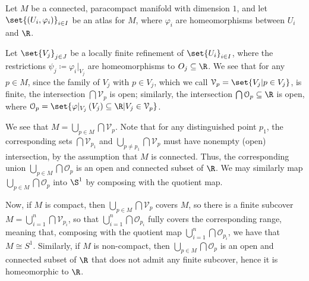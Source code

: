 \documentclass[10pt]{mypackage}
\begin{document}
\begin{solution}
  Let $M$ be a connected, paracompact manifold with dimension $1$, and let $\set{\left( U_i,\varphi_i \right)}_{i\in I}$ be an atlas for $M$, where $\varphi_i$ are homeomorphisms between $U_i$ and $\R$.\newline

  Let $\set{V_{j}}_{j\in J}$ be a locally finite refinement of $\set{U_i}_{i\in I}$, where the restrictions $\psi_j \coloneq \varphi_i|_{V_j}$ are homeomorphisms to $O_{j}\subseteq \R$. We see that for any $p\in M$, since the family of $V_j$ with $p\in V_j$, which we call $\mathcal{V}_p = \set{V_j | p\in V_j}$, is finite, the intersection $\bigcap \mathcal{V}_p$ is open; similarly, the intersection $\bigcap \mathcal{O}_p\subseteq \R$ is open, where $\mathcal{O}_p = \set{\varphi\vert_{V_j}\left( V_j \right)\subseteq \R | V_j\in \mathcal{V}_p}$.\newline

  We see that $M = \bigcup_{p\in M} \bigcap \mathcal{V}_p$. Note that for any distinguished point $p_1$, the corresponding sets $\bigcap \mathcal{V}_{p_1}$ and $\bigcup_{p\neq p_1} \bigcap \mathcal{V}_{p}$ must have nonempty (open) intersection, by the assumption that $M$ is connected. Thus, the corresponding union $\bigcup_{p\in M}\bigcap \mathcal{O}_p$ is an open and connected subset of $\R$. We may similarly map $\bigcup_{p\in M} \bigcap \mathcal{O}_p$ into $\S^1$ by composing with the quotient map.\newline

  Now, if $M$ is compact, then $\bigcup_{p\in M}\bigcap \mathcal{V}_p$ covers $M$, so there is a finite subcover $M = \bigcup_{i=1}^{n}\bigcap \mathcal{V}_{p_i}$, so that $\bigcup_{i=1}^{n}\bigcap \mathcal{O}_{p_i}$ fully covers the corresponding range, meaning that, composing with the quotient map $\bigcup_{i=1}^{n} \bigcap \mathcal{O}_{p_i}$, we have that $M \cong S^{1}$. Similarly, if $M$ is non-compact, then $\bigcup_{p\in M}\bigcap\mathcal{O}_p$ is an open and connected subset of $\R$ that does not admit any finite subcover, hence it is homeomorphic to $\R$.
\end{solution}
\end{document}
